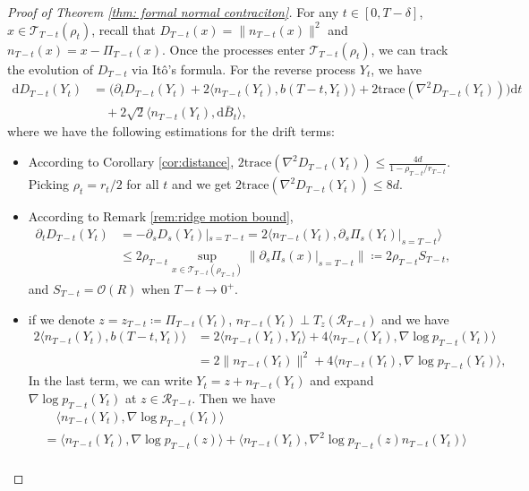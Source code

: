 \documentclass[11pt]{article}
\newcommand{\dee}{\mathrm{d}}
\newcommand{\mc}{\mathcal}
\newcommand{\Tr}{\mathrm{trace}}
\begin{document}
\begin{proof}[Proof of Theorem \ref{thm: formal normal contraciton}]
For any $t\in [0,T-\delta]$, $x\in \mc{T}_{T-t}(\rho_t)$, recall that $D_{T-t}(x)=\| n_{T-t}(x) \|^2$ and $n_{T-t}(x)=x-\Pi_{T-t}(x)$. Once the processes enter $\mc{T}_{T-t}(\rho_t)$, we can track the evolution of $D_{T-t}$ via It\^o's formula. For the reverse process $Y_t$, we have
\begin{align*}
    \dee D_{T-t}(Y_t) &= \big( \partial_t D_{T-t}(Y_t) + 2\langle n_{T-t}(Y_t), b(T-t,Y_t) \rangle + 2\Tr(\nabla^2 D_{T-t}(Y_t))\big)\dee t \\
    &\quad + 2\sqrt{2}\langle n_{T-t}(Y_t),\dee \bar{B}_t \rangle,
\end{align*}
where we have the following estimations for the drift terms:
\begin{itemize}
    \item [(1)] According to Corollary \ref{cor:distance}, $2\Tr(\nabla^2 D_{T-t}(Y_t))\le \tfrac{4d}{1-\rho_{T-t}/r_{T-t}}$. Picking $\rho_t=r_t/2$ for all $t$ and we get $2\Tr(\nabla^2 D_{T-t}(Y_t))\le 8d$.
    \item [(2)] According to Remark \ref{rem:ridge motion bound}, 
    \begin{align*}
        \partial_t D_{T-t}(Y_t)&=-\partial_s D_s(Y_t)|_{s=T-t}= 2\langle n_{T-t}(Y_t), \partial_s \Pi_s (Y_t) |_{s=T-t}  \rangle \\
        &\le 2\rho_{T-t} \sup_{x\in \mc{T}_{T-t}(\rho_{T-t})}\| \partial_s\Pi_s(x)|_{s=T-t} \|  \coloneqq 2\rho_{T-t} S_{T-t} ,
    \end{align*}
    and $S_{T-t}= \mc{O}(R)$ when $T-t\to 0^+$.
    \item [(3)] if we denote $z=z_{T-t}\coloneqq \Pi_{T-t}(Y_t)$, $n_{T-t}(Y_t)\perp T_z(\mc{R}_{T-t})$ and we have
    \begin{align*}
         2\langle n_{T-t}(Y_t) , b(T-t,Y_t) \rangle  & = 2\langle  n_{T-t}(Y_t) ,  Y_t \rangle + 4 \langle  n_{T-t}(Y_t) , \nabla\log p_{T-t}(Y_t) \rangle \\
        & = 2\| n_{T-t}(Y_t) \|^2 + 4 \langle  n_{T-t}(Y_t) , \nabla\log p_{T-t}(Y_t) \rangle,
    \end{align*}
    In the last term, we can write $Y_t=z+n_{T-t}(Y_t)$ and expand $\nabla\log p_{T-t}(Y_t)$ at $z\in \mc{R}_{T-t}$. Then we have
    \begin{align*}
        &\quad \langle  n_{T-t}(Y_t) , \nabla\log p_{T-t}(Y_t) \rangle \\
        & = \langle  n_{T-t}(Y_t) ,  \nabla\log p_{T-t}(z) \rangle + \langle  n_{T-t}(Y_t) ,  \nabla^2\log p_{T-t}(z) n_{T-t}(Y_t) \rangle \\

\end{align*}
\end{itemize}
\end{proof}
\end{document}
